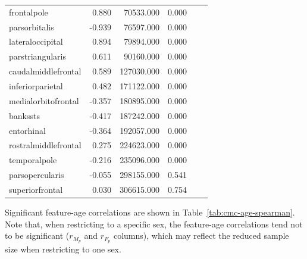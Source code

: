 \documentclass{article}
\begin{document}
\begin{table}
\begin{tabular}{lrrrrr}
	frontalpole              &  0.880 &  70533.000   & 0.000 \\
	parsorbitalis            & -0.939 &  76597.000   & 0.000 \\
	lateraloccipital         &  0.894 &  79894.000   & 0.000 \\
	parstriangularis         &  0.611 &  90160.000   & 0.000 \\
	caudalmiddlefrontal      &  0.589 &  127030.000  & 0.000 \\
	inferiorparietal         &  0.482 &  171122.000  & 0.000 \\
	medialorbitofrontal      & -0.357 &  180895.000  & 0.000 \\
	bankssts                 & -0.417 &  187242.000  & 0.000 \\
	entorhinal               & -0.364 &  192057.000  & 0.000 \\
	rostralmiddlefrontal     &  0.275 &  224623.000  & 0.000 \\
	temporalpole             & -0.216 &  235096.000  & 0.000 \\
	parsopercularis          & -0.055 &  298155.000  & 0.541 \\
	superiorfrontal          &  0.030 &  306615.000  & 0.754 \\
	\bottomrule
\end{tabular}
\end{table}


Significant feature-age correlations are shown in Table~\ref{tab:cmc-age-spearman}. Note
that, when restricting to a specific sex, the feature-age correlations tend not to be
significant (\(r_{M_p}\) and \(r_{F_p}\) columns), which may reflect the reduced sample
size when restricting to one sex.
\end{document}
